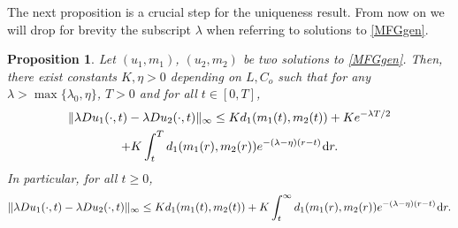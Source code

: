 \documentclass{amsart}
\newtheorem{prop}[thm]{Proposition}
\theoremstyle{remark}
\theoremstyle{definition}
\theoremstyle{Claim}
\newcommand{\dd}{\hspace{0.7pt}{\rm d}}
\theoremstyle{plain}
\begin{document}
%	
	
	The next proposition is a crucial step for the uniqueness result. From now on we will drop for brevity the subscript $\lambda$ when referring to solutions to \eqref{MFGgen}.
		
	\begin{prop}\label{dudist}
		Let $(u_1,m_1)$, $(u_2,m_2)$ be two solutions to \eqref{MFGgen}. Then, there exist constants $K, \eta > 0$ depending on $L, C_o$ such that for any $\lambda>\max\{\lambda_0, \eta\}$, $T>0$ and for all $t\in [0,T]$,
	\begin{multline}\label{stimasu0,T}
	\|\lambda D u_1(\cdot,t) - \lambda D u_2(\cdot,t) \|_\infty  \le
	K  d_1(m_1(t), m_2(t)) + Ke^{-\lambda T/2}\\
	+K \int_{t}^{T}  d_1(m_1(r), m_2(r)) e^{-(\lambda - \eta) (r-t)}  \dd r.
\end{multline}
In particular, for all $t\geq 0$,
	\begin{equation}\label{Ttoinfty}
		\|\lambda D u_1(\cdot,t) - \lambda D u_2(\cdot,t) \|_\infty  \le
		K  d_1(m_1(t), m_2(t))			+K \int_{t}^{\infty}  d_1(m_1(r), m_2(r)) e^{-(\lambda - \eta) (r-t)}  \dd r.
\end{equation}
	\end{prop}
	
\end{document}
